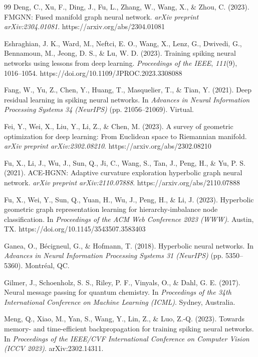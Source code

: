 \documentclass[a4paper,fleqn]{cas-dc}
\begin{document}
\begin{thebibliography}{99}
Deng, C., Xu, F., Ding, J., Fu, L., Zhang, W., Wang, X., \& Zhou, C. (2023). FMGNN: Fused manifold graph neural network. \textit{arXiv preprint arXiv:2304.01081}. https://arxiv.org/abs/2304.01081

Eshraghian, J. K., Ward, M., Neftci, E. O., Wang, X., Lenz, G., Dwivedi, G., Bennamoun, M., Jeong, D. S., \& Lu, W. D. (2023). Training spiking neural networks using lessons from deep learning. \textit{Proceedings of the IEEE}, \textit{111}(9), 1016--1054. https://doi.org/10.1109/JPROC.2023.3308088

Fang, W., Yu, Z., Chen, Y., Huang, T., Masquelier, T., \& Tian, Y. (2021). Deep residual learning in spiking neural networks. In \textit{Advances in Neural Information Processing Systems 34 (NeurIPS)} (pp. 21056--21069). Virtual.

Fei, Y., Wei, X., Liu, Y., Li, Z., \& Chen, M. (2023). A survey of geometric optimization for deep learning: From Euclidean space to Riemannian manifold. \textit{arXiv preprint arXiv:2302.08210}. https://arxiv.org/abs/2302.08210

Fu, X., Li, J., Wu, J., Sun, Q., Ji, C., Wang, S., Tan, J., Peng, H., \& Yu, P. S. (2021). ACE-HGNN: Adaptive curvature exploration hyperbolic graph neural network. \textit{arXiv preprint arXiv:2110.07888}. https://arxiv.org/abs/2110.07888

Fu, X., Wei, Y., Sun, Q., Yuan, H., Wu, J., Peng, H., \& Li, J. (2023). Hyperbolic geometric graph representation learning for hierarchy-imbalance node classification. In \textit{Proceedings of the ACM Web Conference 2023 (WWW)}. Austin, TX. https://doi.org/10.1145/3543507.3583403

Ganea, O., B\'ecigneul, G., \& Hofmann, T. (2018). Hyperbolic neural networks. In \textit{Advances in Neural Information Processing Systems 31 (NeurIPS)} (pp. 5350--5360). Montr\'eal, QC.

Gilmer, J., Schoenholz, S. S., Riley, P. F., Vinyals, O., \& Dahl, G. E. (2017). Neural message passing for quantum chemistry. In \textit{Proceedings of the 34th International Conference on Machine Learning (ICML)}. Sydney, Australia.

Meng, Q., Xiao, M., Yan, S., Wang, Y., Lin, Z., \& Luo, Z.-Q. (2023). Towards memory- and time-efficient backpropagation for training spiking neural networks. In \textit{Proceedings of the IEEE/CVF International Conference on Computer Vision (ICCV 2023)}. arXiv:2302.14311.


\end{thebibliography}
\end{document}
